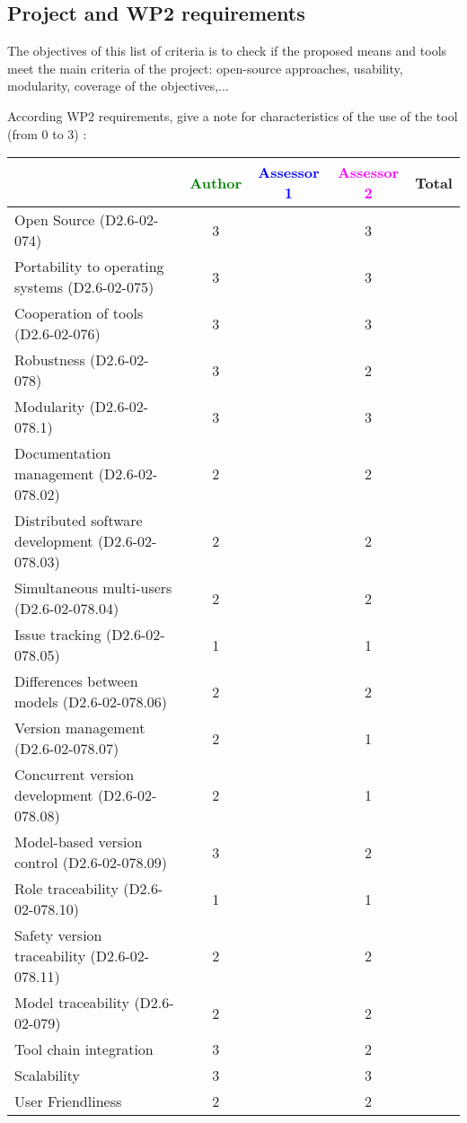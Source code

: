 \subsection{Project and WP2 requirements}

The objectives of this list of criteria is to check if the proposed means and tools meet the main criteria of the project: open-source approaches, usability, modularity, coverage of the objectives,...

According WP2 requirements, give a note for characteristics of the use of the tool (from 0 to 3) :

\begin{tabular}{|l | c | c | c | c|}
\hline
& \textcolor{green}{Author} & \textcolor{blue}{Assessor 1} & \textcolor{magenta}{Assessor 2} & Total \\
\hline
Open Source (D2.6-02-074) & 3 & & 3 &  \\
\hline
Portability to operating systems (D2.6-02-075) & 3 & & 3 &  \\
\hline
Cooperation of tools (D2.6-02-076) & 3 & & 3 &  \\
\hline
Robustness (D2.6-02-078) & 3 & & 2 & \\
\hline
Modularity (D2.6-02-078.1) & 3 & & 3 & \\
\hline
Documentation management (D2.6-02-078.02) & 2 & & 2 & \\
\hline
Distributed software development (D2.6-02-078.03)  & 2 & & 2 & \\
\hline
Simultaneous multi-users (D2.6-02-078.04)   & 2 & & 2 & \\
\hline
Issue tracking (D2.6-02-078.05) & 1 & & 1 & \\
\hline
Differences between models (D2.6-02-078.06) & 2 & & 2 & \\
\hline
Version management (D2.6-02-078.07) & 2 & & 1 & \\
\hline
Concurrent version development (D2.6-02-078.08) & 2 & & 1 & \\
\hline
Model-based version control (D2.6-02-078.09) & 3 & & 2 & \\
\hline
Role traceability (D2.6-02-078.10) & 1 & & 1 & \\
\hline
Safety version traceability (D2.6-02-078.11) & 2 & & 2 & \\
\hline
Model traceability (D2.6-02-079) & 2 & & 2 & \\
\hline
Tool chain integration & 3 & & 2 & \\
\hline
Scalability & 3 & & 3 & \\
\hline
User Friendliness & 2 & & 2 & \\
\hline
\end{tabular}

